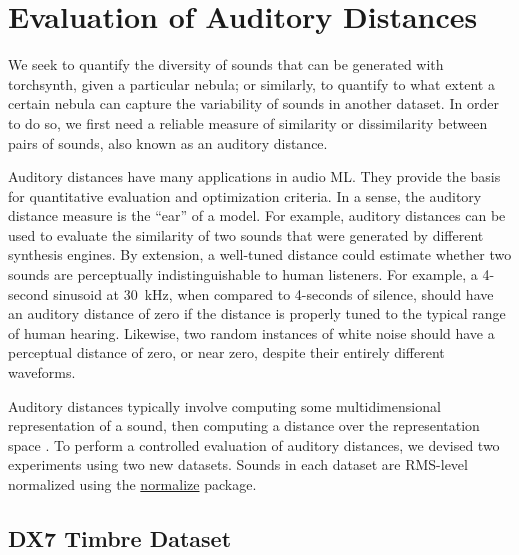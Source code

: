 




\section{Evaluation of Auditory Distances}

We seek to quantify the diversity of sounds that can be generated with torchsynth, given a particular nebula; or similarly, to quantify to what extent a certain nebula can capture the variability of sounds in another dataset. In order to do so, we first need a reliable measure of similarity or dissimilarity between pairs of sounds, also known as an auditory distance. 

Auditory distances have many applications in audio ML. They provide the basis for quantitative evaluation and optimization criteria. In a sense, the auditory distance measure is the ``ear'' of a model. For example, auditory distances can be used to evaluate the similarity of two sounds that were generated by different synthesis engines. By extension, a well-tuned distance could estimate whether two sounds are perceptually indistinguishable to human listeners. For example, a 4-second sinusoid at 30~kHz, when compared to 4-seconds of silence, should have an auditory distance of zero if the distance is properly tuned to the typical range of human hearing. Likewise, two random instances of white noise should have a perceptual distance of zero, or near zero, despite their entirely different waveforms.

Auditory distances typically involve computing some multidimensional representation of a sound, then computing a distance over the representation space \cite{turian2020im}.
To perform a controlled evaluation of auditory distances, we devised two experiments using two new datasets.
Sounds in each dataset are RMS-level normalized using the \href{https://github.com/kklobe/normalize}{normalize} package.



\subsection{DX7 Timbre Dataset}
\label{sec:dx7}

